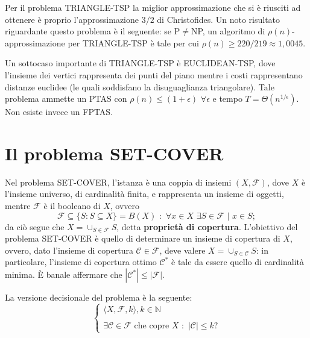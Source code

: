 Per il problema TRIANGLE-TSP la miglior approssimazione che si è riusciti ad ottenere è proprio l'approssimazione $3/2$ di Christofides. Un noto risultato riguardante questo problema è il seguente: se P$\neq$NP, un algoritmo di $\rho (n)$-approssimazione per TRIANGLE-TSP è tale per cui $\rho (n) \geq 220/219 \approx 1,0045$.

Un sottocaso importante di TRIANGLE-TSP è EUCLIDEAN-TSP, dove l'insieme dei vertici rappresenta dei punti del piano mentre i costi rappresentano distanze euclidee (le quali soddisfano la disuguaglianza triangolare). Tale problema ammette un PTAS con $\rho (n) \leq (1+\epsilon)\,\, \forall\epsilon$ e tempo $T=\Theta(n^{1/\epsilon})$. Non esiste invece un FPTAS.

\section{Il problema SET-COVER}
Nel problema SET-COVER, l'istanza è una coppia di insiemi $(X, \mathcal{F})$, dove $X$ è l'insieme universo, di cardinalità finita, e rappresenta un insieme di oggetti, mentre $\mathcal{F}$ è il booleano di $X$, ovvero
\[
\mathcal{F} \subseteq \{S: S \subseteq X\} = B(X) \,\, : \,\, \forall x \in X \,\, \exists S \in \mathcal{F} \,\, | \,\, x \in S;
\]
da ciò segue che $X=\cup_{S\in\mathcal{F}}S$, detta \textbf{proprietà di copertura}.
L'obiettivo del problema SET-COVER è quello di determinare un insieme di copertura di $X$, ovvero, dato l'insieme di copertura $\mathcal{C}\in\mathcal{F}$, deve valere $X=\cup_{S\in\mathcal{C}}S$: in particolare, l'insieme di copertura ottimo $\mathcal{C^*}$ è tale da essere quello di cardinalità minima. È banale affermare che $|\mathcal{C^*}| \leq |\mathcal{F}|$.

La versione decisionale del problema è la seguente:
\[
\begin{cases}
\langle X,\mathcal{F},k \rangle, k\in\mathbb{N} \\
\\
\exists \mathcal{C} \in \mathcal{F} \mbox{ che copre } X \,\, : \,\, |\mathcal{C}| \leq k?
\end{cases}
\]

